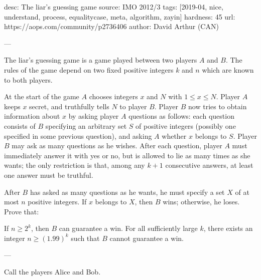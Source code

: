 desc: The liar's guessing game
source: IMO 2012/3
tags: [2019-04, nice, understand, process, equalitycase, meta, algorithm, zayin]
hardness: 45
url: https://aops.com/community/p2736406
author: David Arthur (CAN)

---

The liar's guessing game is a game played between two players $A$ and $B$.
The rules of the game depend on two fixed positive integers $k$ and $n$
which are known to both players.

At the start of the game $A$
chooses integers $x$ and $N$ with $1 \le x \le N$.
Player $A$ keeps $x$ secret, and truthfully tells $N$ to player $B$.
Player $B$ now tries to obtain information about $x$
by asking player $A$ questions as follows:
each question consists of $B$ specifying an arbitrary set $S$
of positive integers (possibly one specified in some previous question),
and asking $A$ whether $x$ belongs to $S$.
Player $B$ may ask as many questions as he wishes.
After each question, player $A$ must immediately answer
it with yes or no, but is allowed to lie as many times as she wants;
the only restriction is that, among any $k+1$ consecutive answers,
at least one answer must be truthful.

After $B$ has asked as many questions as he wants,
he must specify a set $X$ of at most $n$ positive integers.
If $x$ belongs to $X$, then $B$ wins;
otherwise, he loses.
Prove that:

\begin{enumerate}[(a)]
  \ii If $n \ge 2^k$, then $B$ can guarantee a win.
  \ii For all sufficiently large $k$,
  there exists an integer $n \ge (1.99)^k$
  such that $B$ cannot guarantee a win.
\end{enumerate}

---

Call the players Alice and Bob.


